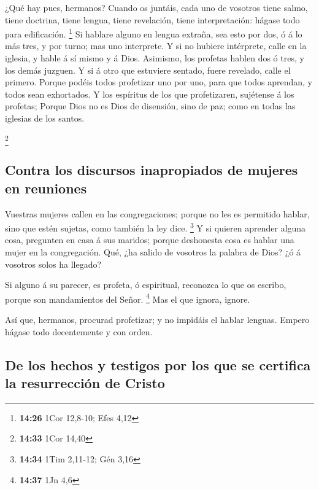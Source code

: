  ¿Qué hay pues, hermanos? Cuando os juntáis, cada uno de
vosotros tiene salmo, tiene doctrina, tiene lengua, tiene revelación,
tiene interpretación: hágase todo para edificación. \footnote{\textbf{14:26}
  1Cor 12,8-10; Efes 4,12}  Si hablare alguno en lengua
extraña, sea esto por dos, ó á lo más tres, y por turno; mas uno
interprete.  Y si no hubiere intérprete, calle en la
iglesia, y hable á sí mismo y á Dios.  Asimismo, los
profetas hablen dos ó tres, y los demás juzguen.  Y si á
otro que estuviere sentado, fuere revelado, calle el primero.
 Porque podéis todos profetizar uno por uno, para que todos
aprendan, y todos sean exhortados.  Y los espíritus de los
que profetizaren, sujétense á los profetas;  Porque Dios no
es Dios de disensión, sino de paz; como en todas las iglesias de los
santos.

\footnote{\textbf{14:33} 1Cor 14,40}

\hypertarget{contra-los-discursos-inapropiados-de-mujeres-en-reuniones}{%
\subsection{Contra los discursos inapropiados de mujeres en
reuniones}\label{contra-los-discursos-inapropiados-de-mujeres-en-reuniones}}

 Vuestras mujeres callen en las congregaciones; porque no
les es permitido hablar, sino que estén sujetas, como también la ley
dice. \footnote{\textbf{14:34} 1Tim 2,11-12; Gén 3,16}  Y
si quieren aprender alguna cosa, pregunten en casa á sus maridos; porque
deshonesta cosa es hablar una mujer en la congregación. 
Qué, ¿ha salido de vosotros la palabra de Dios? ¿ó á vosotros solos ha
llegado?

 Si alguno á su parecer, es profeta, ó espiritual,
reconozca lo que os escribo, porque son mandamientos del Señor.
\footnote{\textbf{14:37} 1Jn 4,6}  Mas el que ignora,
ignore.

 Así que, hermanos, procurad profetizar; y no impidáis el
hablar lenguas.  Empero hágase todo decentemente y con
orden.

\hypertarget{de-los-hechos-y-testigos-por-los-que-se-certifica-la-resurrecciuxf3n-de-cristo}{%
\subsection{De los hechos y testigos por los que se certifica la
resurrección de
Cristo}\label{de-los-hechos-y-testigos-por-los-que-se-certifica-la-resurrecciuxf3n-de-cristo}}

